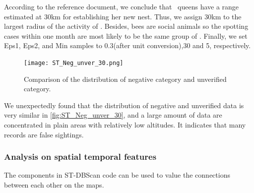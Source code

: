 \documentclass{mcmthesis}
\begin{document}
According to the reference\cite{AGH} document, we conclude that \VM\ queens have a range estimated at 30km for establishing her new nest. Thus, we assign 30km to the largest radius of the activity of \VM. Besides, bees are social animals so the spotting cases within one month are most likely to be the same group of \VM. Finally, we set Eps1, Eps2, and Min samples to 0.3(after unit conversion),30 and 5, respectively.
\begin{figure}[h]
    \centering
    \texttt{[image: ST\_Neg\_unver\_30.png]}
    \caption{Comparison of the distribution of negative category and unverified category.}
    \label{fig:ST_Neg_unver_30}
\end{figure}

We unexpectedly found that the distribution of negative and unverified data is very similar in \autoref{fig:ST_Neg_unver_30}, and a large amount of data are concentrated in plain areas with relatively low altitudes. It indicates that many records are false sightings.
\subsubsection{Analysis on spatial temporal features}
\label{section:ST_analysis}
The components in ST-DBScan code can be used to value the connections between each other on the maps.
\end{document}

